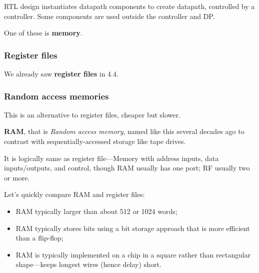 \documentclass[a4paper,11pt]{article}
\begin{document}
RTL design instantiates datapath
components to create datapath,
controlled by a controller.
Some components are used
outside the controller and DP.

One of these is \textbf{memory}.

\subsubsection{Register files}

We already saw \textbf{register files} in 4.4.

\subsubsection{Random access memories}

This is an alternative to register files, cheaper but slower.

\textbf{RAM}, that is \textit{Random access memory}, named like this several decades ago to contrast with sequentially-accessed storage like tape drives.

It is logically same as register file—Memory with address inputs, data inputs/outputs, and control, though RAM usually has one port; RF usually two or more.

Let's quickly compare RAM and register files:
\begin{itemize}
	\item RAM typically larger than about 512 or 1024 words;
	\item RAM typically stores bits using a bit storage approach that is more efficient than a flip-flop;
	\item RAM is typically implemented on a chip in a square
	      rather than rectangular shape—keeps longest wires
	      (hence delay) short.
\end{itemize}
\end{document}

